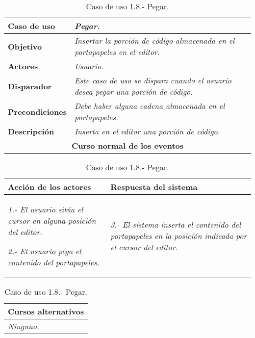 \documentclass[twoside,a4paper,11pt]{book}
\begin{document}
\begin{table}[!ht]
    \centering
    \begin{tabular}{|p{4cm}|p{11.5cm}|}
    \hline

    \textbf{Caso de uso} & \textit{Pegar.}\\
    \hline

    \textbf{Objetivo} & \textit{Insertar la porción de código almacenada en el portapapeles en el editor.}\\
    \hline

    \textbf{Actores} & \textit{Usuario.}\\
    \hline

    \textbf{Disparador} & \textit{Este caso de uso se dispara cuando el usuario desea pegar una porción de código.}\\
    \hline

    \textbf{Precondiciones} & \textit{Debe haber alguna cadena almacenada en el portapapeles.}\\
    \hline

    \textbf{Descripción} & \textit{Inserta en el editor una porción de código.}\\
    \hline

    \multicolumn{2}{|c|}{\textbf{Curso normal de los eventos}}\\
    \hline

    \end{tabular}
    \begin{tabular}{|p{7.75cm}|p{7.75cm}|}
    \hspace{2cm}\textbf{Acción de los actores} & \hspace{1.75cm}\textbf{Respuesta del sistema}\\
    \hline

    \textit{1.- El usuario sitúa el cursor en alguna posición del editor.}

    \textit{2.- El usuario pega el contenido del portapapeles.}
    &
    \textit{3.- El sistema inserta el contenido del portapapeles en la posición indicada por el cursor del editor.}
    \\
    \hline
    \end{tabular}

    \begin{tabular}{|p{15.9cm}|}
      \hspace{6cm}\textbf{Cursos alternativos}\\
      \hline     
	\textit{Ninguno.}
      \\
      \hline
    \end{tabular}
    \caption{Caso de uso 1.8.- Pegar.}
\end{table}
\end{document}
